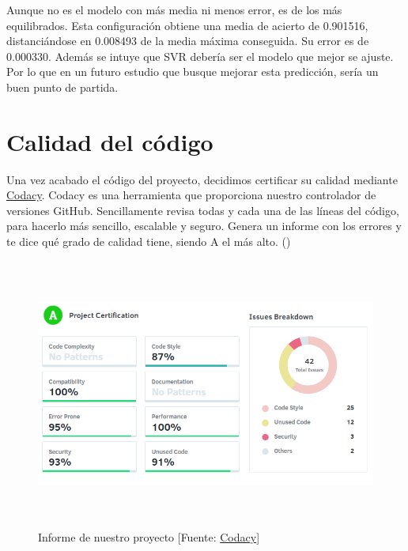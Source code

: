 Aunque no es el modelo con más media ni menos error, es de los más equilibrados. Esta configuración obtiene una media de acierto de 0.901516, distanciándose en 0.008493 de la media máxima conseguida. Su error es de 0.000330. Además se intuye que SVR debería ser el modelo que mejor se ajuste. Por lo que en un futuro estudio que busque mejorar esta predicción, sería un buen punto de partida.

\section{Calidad del código}
\label{makereference7.1}

Una vez acabado el código del proyecto, decidimos certificar su calidad mediante \href{https://www.codacy.com}{Codacy}.
Codacy es una herramienta que proporciona nuestro controlador de versiones GitHub. Sencillamente revisa todas y cada una de las líneas del código, para hacerlo más sencillo, escalable y seguro. Genera un informe con los errores y te dice qué grado de calidad tiene, siendo A el más alto. (\cite{ARP:Codacy:2017})

\begin{figure}[htb]
	\begin{center}
		\includegraphics[height=3.5in]{figures/codacy.png}
		\caption{Informe de nuestro proyecto [Fuente: \href{https://www.codacy.com}{Codacy}] \label{codacy}}
	\end{center}
\end{figure}